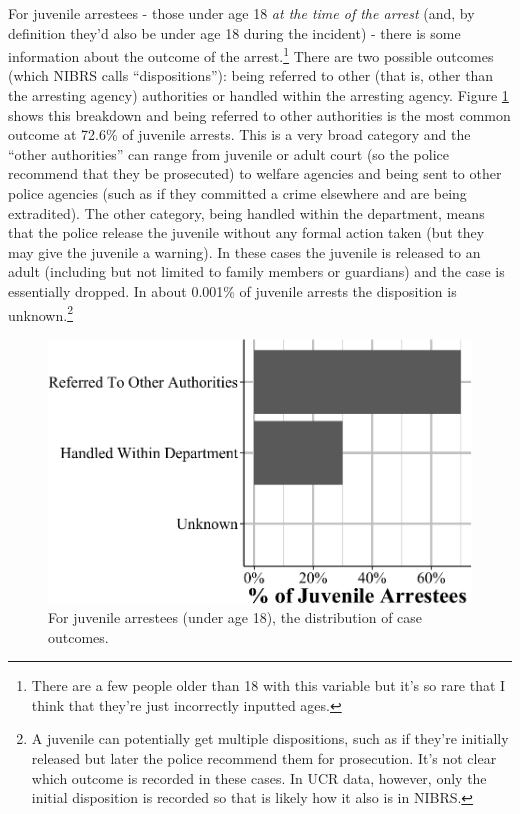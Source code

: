 \documentclass[
  12pt,
  openany]{book}
\begin{document}
For juvenile arrestees - those under age 18 \emph{at the time of the arrest} (and, by definition they'd also be under age 18 during the incident) - there is some information about the outcome of the arrest.\footnote{There are a few people older than 18 with this variable but it's so rare that I think that they're just incorrectly inputted ages.} There are two possible outcomes (which NIBRS calls ``dispositions''): being referred to other (that is, other than the arresting agency) authorities or handled within the arresting agency. Figure \ref{fig:arresteeJuvenileDisposition} shows this breakdown and being referred to other authorities is the most common outcome at 72.6\% of juvenile arrests. This is a very broad category and the ``other authorities'' can range from juvenile or adult court (so the police recommend that they be prosecuted) to welfare agencies and being sent to other police agencies (such as if they committed a crime elsewhere and are being extradited). The other category, being handled within the department, means that the police release the juvenile without any formal action taken (but they may give the juvenile a warning). In these cases the juvenile is released to an adult (including but not limited to family members or guardians) and the case is essentially dropped. In about 0.001\% of juvenile arrests the disposition is unknown.\footnote{A juvenile can potentially get multiple dispositions, such as if they're initially released but later the police recommend them for prosecution. It's not clear which outcome is recorded in these cases. In UCR data, however, only the initial disposition is recorded so that is likely how it also is in NIBRS.}

\begin{figure}

{\centering \includegraphics[width=0.9\linewidth]{16_nibrs_arrestee_files/figure-latex/arresteeJuvenileDisposition-1} 

}

\caption{For juvenile arrestees (under age 18), the distribution of case outcomes.}\label{fig:arresteeJuvenileDisposition}
\end{figure}
\end{document}
